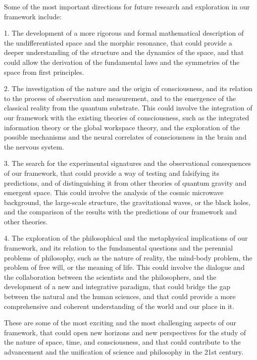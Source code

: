 Some of the most important directions for future research and exploration in our framework include:

1. The development of a more rigorous and formal mathematical description of the undifferentiated space and the morphic resonance, that could provide a deeper understanding of the structure and the dynamics of the space, and that could allow the derivation of the fundamental laws and the symmetries of the space from first principles.

2. The investigation of the nature and the origin of consciousness, and its relation to the process of observation and measurement, and to the emergence of the classical reality from the quantum substrate. This could involve the integration of our framework with the existing theories of consciousness, such as the integrated information theory or the global workspace theory, and the exploration of the possible mechanisms and the neural correlates of consciousness in the brain and the nervous system.

3. The search for the experimental signatures and the observational consequences of our framework, that could provide a way of testing and falsifying its predictions, and of distinguishing it from other theories of quantum gravity and emergent space. This could involve the analysis of the cosmic microwave background, the large-scale structure, the gravitational waves, or the black holes, and the comparison of the results with the predictions of our framework and other theories.

4. The exploration of the philosophical and the metaphysical implications of our framework, and its relation to the fundamental questions and the perennial problems of philosophy, such as the nature of reality, the mind-body problem, the problem of free will, or the meaning of life. This could involve the dialogue and the collaboration between the scientists and the philosophers, and the development of a new and integrative paradigm, that could bridge the gap between the natural and the human sciences, and that could provide a more comprehensive and coherent understanding of the world and our place in it.

These are some of the most exciting and the most challenging aspects of our framework, that could open new horizons and new perspectives for the study of the nature of space, time, and consciousness, and that could contribute to the advancement and the unification of science and philosophy in the 21st century.
